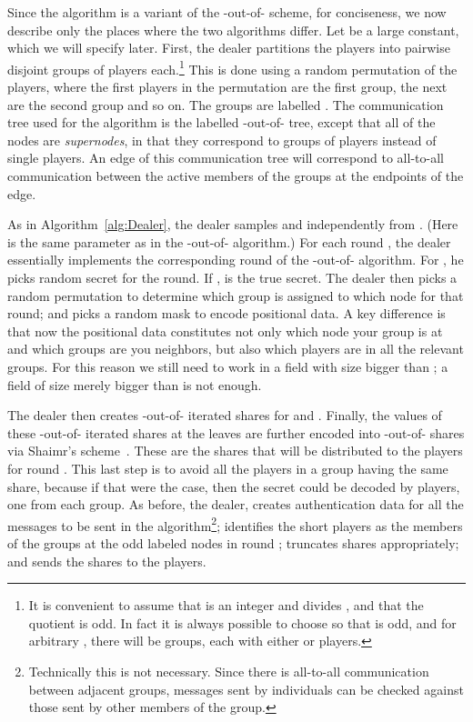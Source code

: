 \documentclass[12pt]{article}
\theoremstyle{definition}
\begin{document}
Since the algorithm is a variant of the -out-of- scheme, for
conciseness, we now describe only the places where the two algorithms
differ.  Let  be a large constant, which we will specify later.
First, the dealer partitions the players into 
pairwise disjoint groups of  players each.\footnote{It is
  convenient to assume that  is an integer and divides
  , and that the quotient  is odd. In fact it is always possible 
  to choose  so that  is odd, and for arbitrary , there will be 
   groups, each 
  with either  or 
  players.}  This is done using a random permutation of the
players, where the first  players in the permutation are the first
group, the next  are the second group and so on. The groups
are labelled . The communication tree used for the 
algorithm is the labelled -out-of- tree, except that all of the 
nodes are \emph{supernodes}, in that they
correspond to groups of  players instead of single
players. An edge of this communication tree will correspond to all-to-all
communication between the active members of the groups at the endpoints 
of the edge.

As in Algorithm~\ref{alg:Dealer}, the dealer samples  and  independently
from . (Here  is the same parameter 
as in the -out-of- algorithm.) For each round , the dealer essentially 
implements the corresponding round of the -out-of- algorithm.  For , he picks 
random secret  for the round.  If ,  is the true secret.  The dealer then picks a random permutation  to determine which group is 
assigned to which node for that round; and picks a random mask  to encode 
positional data.  A key difference is that now the positional data  constitutes 
not only which node your group is at and which groups are you neighbors, but 
also which  players are in all the relevant groups. For this reason 
we still need to work in a field with size bigger than ; a field of size 
merely bigger than  is not enough.

The dealer then creates -out-of- iterated shares for  and . Finally, the values of these 
-out-of- iterated shares at the leaves are further encoded into 
-out-of- shares via Shaimr's scheme~\cite{shamir:how}. 
These are the shares that will be distributed to the players for round .
This last step is to avoid all the players in a group having the same share,
because if that were the case, then the secret could be decoded by 
 players, one from each group. As before, the dealer, creates 
authentication data for all the messages to be sent in the algorithm\footnote{Technically this is not necessary. Since there is all-to-all 
communication between adjacent groups, messages sent by individuals can be 
checked against those sent by other members of the group.};
identifies the short players as the members of the groups at the odd labeled 
nodes in round ; truncates shares appropriately; and sends the shares to 
the players.
\end{document}
